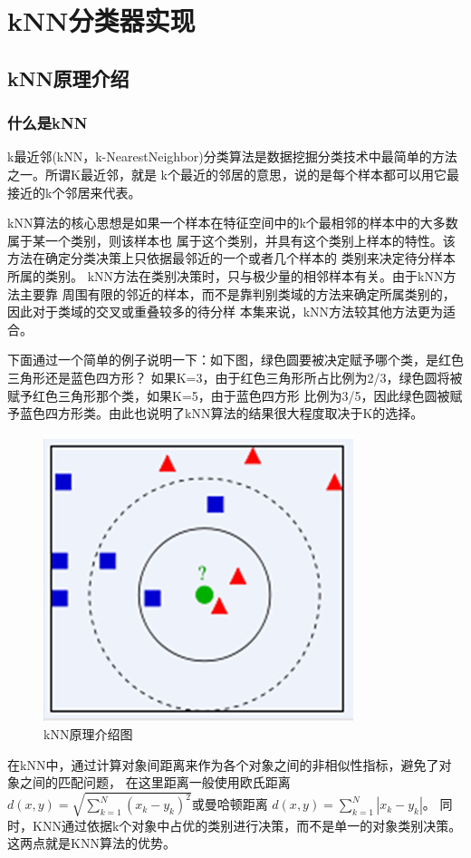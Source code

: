 \section{kNN分类器实现}
\subsection{kNN原理介绍}
\subsubsection{什么是kNN}
k最近邻(kNN，k-NearestNeighbor)分类算法是数据挖掘分类技术中最简单的方法之一。所谓K最近邻，就是
k个最近的邻居的意思，说的是每个样本都可以用它最接近的k个邻居来代表。

kNN算法的核心思想是如果一个样本在特征空间中的k个最相邻的样本中的大多数属于某一个类别，则该样本也
属于这个类别，并具有这个类别上样本的特性。该方法在确定分类决策上只依据最邻近的一个或者几个样本的
类别来决定待分样本所属的类别。 kNN方法在类别决策时，只与极少量的相邻样本有关。由于kNN方法主要靠
周围有限的邻近的样本，而不是靠判别类域的方法来确定所属类别的，因此对于类域的交叉或重叠较多的待分样
本集来说，kNN方法较其他方法更为适合。

下面通过一个简单的例子说明一下：如下图，绿色圆要被决定赋予哪个类，是红色三角形还是蓝色四方形？
如果K=3，由于红色三角形所占比例为2/3，绿色圆将被赋予红色三角形那个类，如果K=5，由于蓝色四方形
比例为3/5，因此绿色圆被赋予蓝色四方形类。由此也说明了kNN算法的结果很大程度取决于K的选择。

\begin{figure}[thbp!]
  \centering
  \includegraphics[width=0.4\linewidth]{figure/KNN/KNNIntro.png}
  \caption{kNN原理介绍图}
  \label{fig:KNNIntro}
\end{figure}

在kNN中，通过计算对象间距离来作为各个对象之间的非相似性指标，避免了对象之间的匹配问题，
在这里距离一般使用欧氏距离$d(x,y)=\sqrt{\sum_{k=1}^N (x_k-y_k)^2}$或曼哈顿距离
$d(x,y)=\sum_{k=1}^N \left|x_k-y_k\right|$。
同时，KNN通过依据k个对象中占优的类别进行决策，而不是单一的对象类别决策。这两点就是KNN算法的优势。

